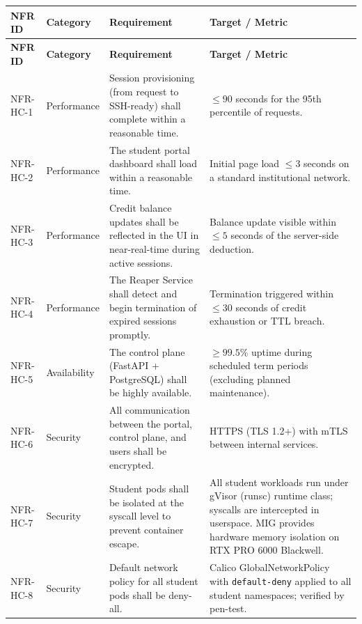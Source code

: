 \documentclass[12pt,a4paper]{article}
\begin{document}
\begin{longtable}{@{}L{2.4cm}L{2.5cm}L{5.3cm}L{4.5cm}@{}}
  
    \textbf{NFR ID} & \textbf{Category} & \textbf{Requirement} & \textbf{Target / Metric} \\
  \midrule
  \endfirsthead
  
    \textbf{NFR ID} & \textbf{Category} & \textbf{Requirement} & \textbf{Target / Metric} \\
  \midrule
  \endhead
  
  \endfoot

  NFR-HC-1 & Performance & Session provisioning (from request to SSH-ready) shall complete within a reasonable time. & $\leq 90$ seconds for the 95th percentile of requests. \\
    NFR-HC-2 & Performance & The student portal dashboard shall load within a reasonable time. & Initial page load $\leq 3$ seconds on a standard institutional network. \\
  NFR-HC-3 & Performance & Credit balance updates shall be reflected in the UI in near-real-time during active sessions. & Balance update visible within $\leq 5$ seconds of the server-side deduction. \\
    NFR-HC-4 & Performance & The Reaper Service shall detect and begin termination of expired sessions promptly. & Termination triggered within $\leq 30$ seconds of credit exhaustion or TTL breach. \\
  NFR-HC-5 & Availability & The control plane (FastAPI + PostgreSQL) shall be highly available. & $\geq 99.5\%$ uptime during scheduled term periods (excluding planned maintenance). \\
    NFR-HC-6 & Security & All communication between the portal, control plane, and users shall be encrypted. & HTTPS (TLS 1.2+) with mTLS between internal services. \\
  NFR-HC-7 & Security & Student pods shall be isolated at the syscall level to prevent container escape. & All student workloads run under gVisor (runsc) runtime class; syscalls are intercepted in userspace. MIG provides hardware memory isolation on RTX PRO 6000 Blackwell. \\
    NFR-HC-8 & Security & Default network policy for all student pods shall be deny-all. & Calico GlobalNetworkPolicy with \texttt{default-deny} applied to all student namespaces; verified by pen-test. \\

\end{longtable}
\end{document}
